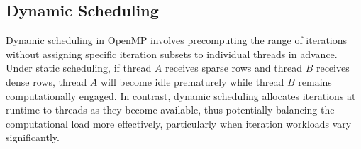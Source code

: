




\subsection{Dynamic Scheduling}

Dynamic scheduling in OpenMP involves precomputing the range of iterations without assigning specific iteration subsets to individual threads in advance. Under static scheduling, if thread \(A\) receives sparse rows and thread \(B\) receives dense rows, thread \(A\) will become idle prematurely while thread \(B\) remains computationally engaged. In contrast, dynamic scheduling allocates iterations at runtime to threads as they become available, thus potentially balancing the computational load more effectively, particularly when iteration workloads vary significantly.

